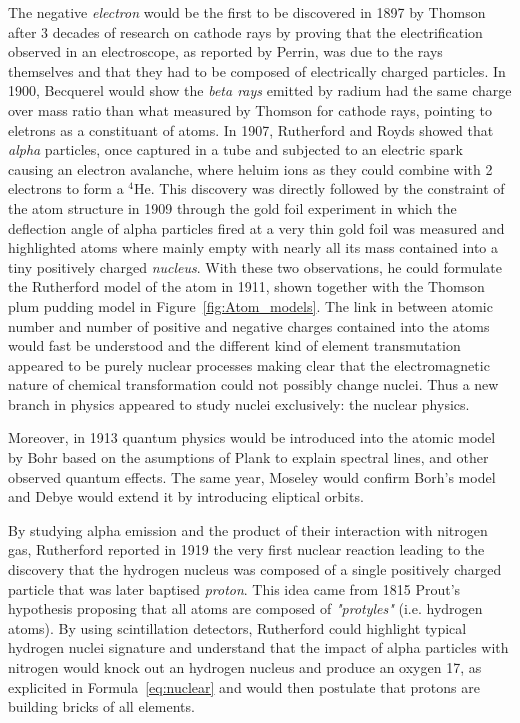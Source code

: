 	The negative \textit{electron} would be the first to be discovered in 1897 by Thomson after 3 decades of research on cathode rays by proving that the electrification observed in an electroscope, as reported by Perrin, was due to the rays themselves and that they had to be composed of electrically charged particles. In 1900, Becquerel would show the \textit{beta rays} emitted by radium had the same charge over mass ratio than what measured by Thomson for cathode rays, pointing to eletrons as a constituant of atoms. In 1907, Rutherford and Royds showed that \textit{alpha} particles, once captured in a tube and subjected to an electric spark causing an electron avalanche, where heluim ions as they could combine with 2 electrons to form a $^4$He. This discovery was directly followed by the constraint of the atom structure in 1909 through the gold foil experiment in which the deflection angle of alpha particles fired at a very thin gold foil was measured and highlighted atoms where mainly empty with nearly all its mass contained into a tiny positively charged \textit{nucleus}. With these two observations, he could formulate the Rutherford model of the atom in 1911, shown together with the Thomson plum pudding model in Figure~\ref{fig:Atom_models}. The link in between atomic number and number of positive and negative charges contained into the atoms would fast be understood and the different kind of element transmutation appeared to be purely nuclear processes making clear that the electromagnetic nature of chemical transformation could not possibly change nuclei. Thus a new branch in physics appeared to study nuclei exclusively: the nuclear physics.
	
	Moreover, in 1913 quantum physics would be introduced into the atomic model by Bohr based on the asumptions of Plank to explain spectral lines, and other observed quantum effects. The same year, Moseley would confirm Borh's model and Debye would extend it by introducing eliptical orbits.
	
	By studying alpha emission and the product of their interaction with nitrogen gas, Rutherford reported in 1919 the very first nuclear reaction leading to the discovery that the hydrogen nucleus was composed of a single positively charged particle that was later baptised \textit{proton}. This idea came from 1815 Prout's hypothesis proposing that all atoms are composed of \textit{"protyles"} (i.e. hydrogen atoms). By using scintillation detectors, Rutherford could highlight typical hydrogen nuclei signature and understand that the impact of alpha particles with nitrogen would knock out an hydrogen nucleus and produce an oxygen 17, as explicited in Formula~\ref{eq:nuclear} and would then postulate that protons are building bricks of all elements.
	
